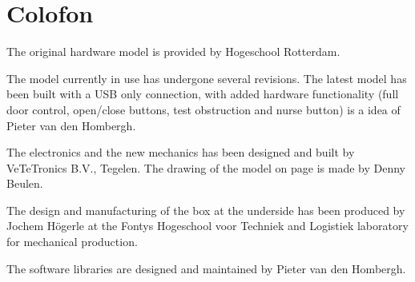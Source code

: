 \section*{Colofon}

The original hardware model is provided by Hogeschool Rotterdam.

The model currently in use has undergone several revisions. The latest
model has been built with a USB only connection, with added hardware
functionality (full door control, open/close buttons, test obstruction
and nurse button) is a idea of Pieter van den Hombergh.

The electronics and the new mechanics has been designed and built  by
VeTeTronics B.V., Tegelen. The drawing of the model on page
\pageref{fig:lift} is made by Denny Beulen.

The design and manufacturing of the box at the underside has been
produced by Jochem Högerle at the Fontys Hogeschool voor Techniek and
Logistiek laboratory for mechanical production. 

The software libraries are designed and maintained by Pieter van den
Hombergh.


